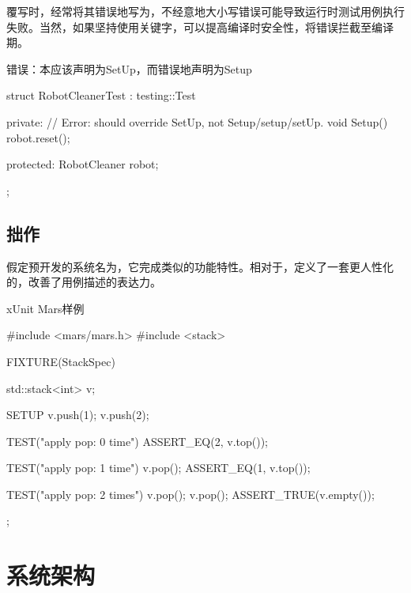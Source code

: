 \begin{content}
覆写时，经常将其错误地写为，不经意地大小写错误可能导致运行时测试用例执行失败。当然，如果坚持使用关键字，可以提高编译时安全性，将错误拦截至编译期。

\begin{nodiff}{错误：本应该声明为SetUp，而错误地声明为Setup}
 \begin{c++}
struct RobotCleanerTest : testing::Test {
private:
  // Error: should override SetUp, not Setup/setup/setUp.
  void Setup() {
    robot.reset();
  }
 
protected:
  RobotCleaner robot;
};
  \end{c++}
\end{nodiff}

\subsection{拙作}

假定预开发的系统名为，它完成类似的功能特性。相对于，定义了一套更人性化的，改善了用例描述的表达力。

\begin{enum}
\end{enum}

\begin{nodiff}{xUnit Mars样例}
 \begin{c++}
#include <mars/mars.h>
#include <stack>

FIXTURE(StackSpec) {
  std::stack<int> v;   

  SETUP {
    v.push(1);
    v.push(2);
  }

  TEST("apply pop: 0 time") {
    ASSERT_EQ(2, v.top());
  }

  TEST("apply pop: 1 time") {
    v.pop();
    ASSERT_EQ(1, v.top());
  }

  TEST("apply pop: 2 times") {
    v.pop();
    v.pop();
    ASSERT_TRUE(v.empty());
  }
}; 
 \end{c++}
\end{nodiff}

\end{content}

\section{系统架构}
	

